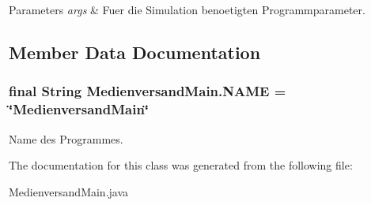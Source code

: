 \begin{DoxyParams}{Parameters}
{\em args} & Fuer die Simulation benoetigten Programmparameter. \\
\hline
\end{DoxyParams}


\subsection{Member Data Documentation}
\hypertarget{classMedienversandMain_a3e8118d08738afd15fe2bf18919b5834}{
\subsubsection[{N\-A\-M\-E}]{\setlength{\rightskip}{0pt plus 5cm}final String Medienversand\-Main.\-N\-A\-M\-E = \char`\"{}Medienversand\-Main\char`\"{}\hspace{0.3cm}{\ttfamily [static]}}}\label{classMedienversandMain_a3e8118d08738afd15fe2bf18919b5834}
Name des Programmes. 

The documentation for this class was generated from the following file\-:\begin{DoxyCompactItemize}
\item 
Medienversand\-Main.\-java\end{DoxyCompactItemize}
